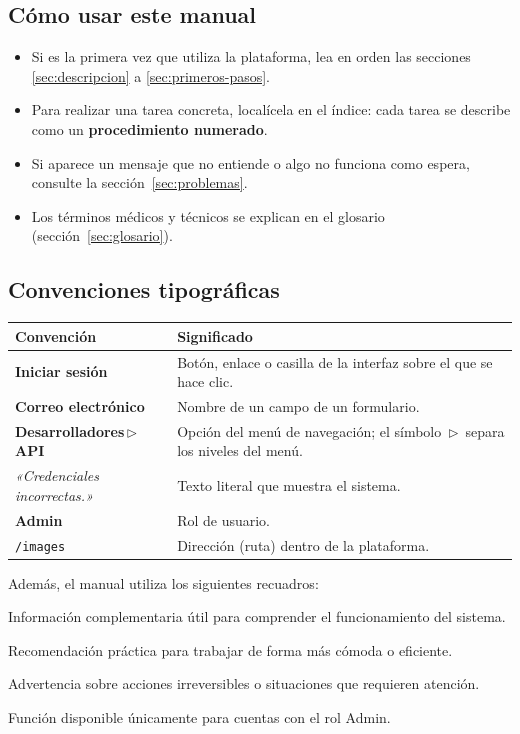 \documentclass[11pt,a4paper]{article}
\newcommand{\campo}[1]{\textbf{\textcolor{dermaTextSoft}{#1}}}
\newcommand{\boton}[1]{\colorbox{dermaSoft}{\textcolor{dermaPrimary}{\textbf{\small #1}}}}
\newcommand{\rol}[1]{\textcolor{dermaPrimary}{\textbf{#1}}}
\newcommand{\menu}[1]{\textsf{\textbf{#1}}}
\newcommand{\mensaje}[1]{\textit{«#1»}}
\newcommand{\flecha}{\,$\triangleright$\,}
\begin{document}
\subsection{Cómo usar este manual}

\begin{itemize}
  \item Si es la primera vez que utiliza la plataforma, lea en orden las secciones
  \ref{sec:descripcion} a \ref{sec:primeros-pasos}.
  \item Para realizar una tarea concreta, localícela en el índice: cada tarea se
  describe como un \textbf{procedimiento numerado}.
  \item Si aparece un mensaje que no entiende o algo no funciona como espera,
  consulte la sección~\ref{sec:problemas}.
  \item Los términos médicos y técnicos se explican en el
  glosario (sección~\ref{sec:glosario}).
\end{itemize}

\subsection{Convenciones tipográficas}

\begin{center}
\begin{tabularx}{\textwidth}{@{}l Y@{}}
\toprule
{}
\textbf{Convención} & \textbf{Significado} \\
\midrule
\boton{Iniciar sesión} & Botón, enlace o casilla de la interfaz sobre el que se
hace clic. \\
\addlinespace
\campo{Correo electrónico} & Nombre de un campo de un formulario. \\
\addlinespace
\menu{Desarrolladores\flecha API} & Opción del menú de navegación; el símbolo
\flecha{} separa los niveles del menú. \\
\addlinespace
\mensaje{Credenciales incorrectas.} & Texto literal que muestra el sistema. \\
\addlinespace
\rol{Admin} & Rol de usuario. \\
\addlinespace
\texttt{/images} & Dirección (ruta) dentro de la plataforma. \\
\bottomrule
\end{tabularx}
\end{center}

Además, el manual utiliza los siguientes recuadros:

\begin{notabox}
Información complementaria útil para comprender el funcionamiento del sistema.
\end{notabox}
\begin{tipbox}
Recomendación práctica para trabajar de forma más cómoda o eficiente.
\end{tipbox}
\begin{warnbox}
Advertencia sobre acciones irreversibles o situaciones que requieren atención.
\end{warnbox}
\begin{adminbox}
Función disponible únicamente para cuentas con el rol Admin.
\end{adminbox}
\end{document}
